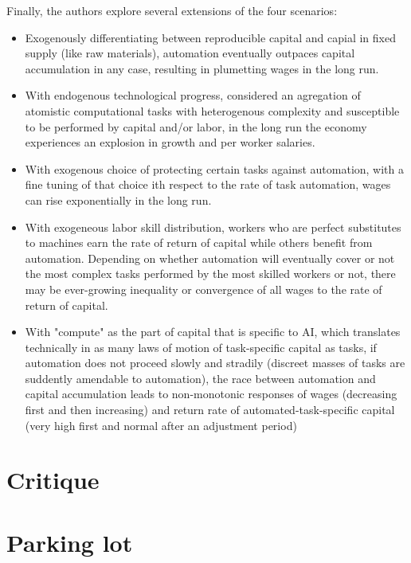 \documentclass{article}
\begin{document}
Finally, the authors explore several extensions of the four scenarios:
\begin{itemize}
    \item Exogenously differentiating between reproducible capital and capial in fixed supply (like raw materials), automation eventually outpaces capital accumulation in any case, resulting in plumetting wages in the long run.
    \item With endogenous technological progress, considered an agregation of atomistic computational tasks with heterogenous complexity and susceptible to be performed by capital and/or labor, in the long run the economy experiences an explosion in growth and per worker salaries.
    \item With exogenous choice of protecting certain tasks against automation, with a fine tuning of that choice ith respect to the rate of task automation, wages can rise exponentially in the long run.
    \item With exogeneous labor skill distribution, workers who are perfect substitutes to machines earn the rate of return of capital while others benefit from automation. Depending on whether automation will eventually cover or not the most complex tasks performed by the most skilled workers or not, there may be ever-growing inequality or convergence of all wages to the rate of return of capital.
    \item With "compute" as the part of capital that is specific to AI, which translates technically in as many laws of motion of task-specific capital as tasks, if automation does not proceed slowly and stradily (discreet masses of tasks are suddently amendable to automation), the race between automation and capital accumulation leads to non-monotonic responses of wages (decreasing first and then increasing) and return rate of automated-task-specific capital (very high first and normal after an adjustment period) 
\end{itemize}

\section{Critique}



\section{Parking lot}
\end{document}

